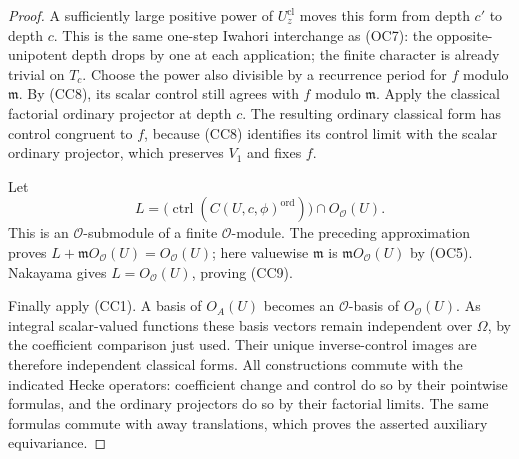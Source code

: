 \begin{proof}
A sufficiently large positive power of \(U_z^{\mathrm{cl}}\)
moves this form from depth \(c'\) to depth \(c\).
This is the same one-step Iwahori interchange as (OC7):
the opposite-unipotent depth drops by one at each application;
the finite character is already trivial on \(T_c\).
Choose the power also divisible by a recurrence period for \(f\)
modulo \(\mathfrak m\).
By (CC8), its scalar control still agrees with \(f\) modulo
\(\mathfrak m\).
Apply the classical factorial ordinary projector at depth \(c\).
The resulting ordinary classical form has control congruent to
\(f\), because (CC8) identifies its control limit with the scalar
ordinary projector, which preserves \(V_1\) and fixes \(f\).

Let
\[
 L=\bigl(\operatorname{ctrl}
       (C(U,c,\phi)^{\mathrm{ord}})\bigr)
               \cap O_{\mathcal O}(U).
\]
This is an \(\mathcal O\)-submodule of a finite
\(\mathcal O\)-module.  The preceding approximation proves
\(L+\mathfrak m O_{\mathcal O}(U)=O_{\mathcal O}(U)\);
here valuewise \(\mathfrak m\) is
\(\mathfrak mO_{\mathcal O}(U)\) by (OC5).
Nakayama gives \(L=O_{\mathcal O}(U)\), proving (CC9).

Finally apply (CC1).
A basis of \(O_A(U)\) becomes an \(\mathcal O\)-basis of
\(O_{\mathcal O}(U)\).
As integral scalar-valued functions these basis vectors remain
independent over \(\Omega\), by the coefficient comparison just
used.  Their unique inverse-control images are therefore
independent classical forms.
All constructions commute with the indicated Hecke operators:
coefficient change and control do so by their pointwise formulas,
and the ordinary projectors do so by their factorial limits.
The same formulas commute with away translations, which proves
the asserted auxiliary equivariance.
\end{proof}

